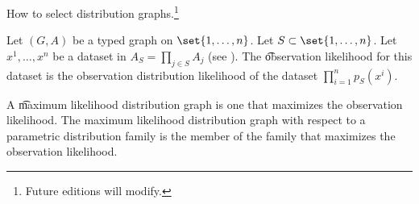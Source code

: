 

How to select distribution graphs.\footnote{Future editions will modify.}


Let $(G, A)$ be a typed graph on $\set{1, \dots, n}$.
Let $S \subset \set{1, \dots, n}$.
Let $x^1, \dots, x^n$ be a dataset in $A_S = \prod_{j \in S} A_j$ (see ).
The \t{observation likelihood} for this dataset is the observation distribution likelihood of the dataset $\prod_{i =1}^{n} p_S(x^i)$.

A \t{maximum likelihood distribution graph} is one that maximizes the observation likelihood.
The maximum likelihood distribution graph with respect to a parametric distribution family is the member of the family that maximizes the observation likelihood.

\blankpage
